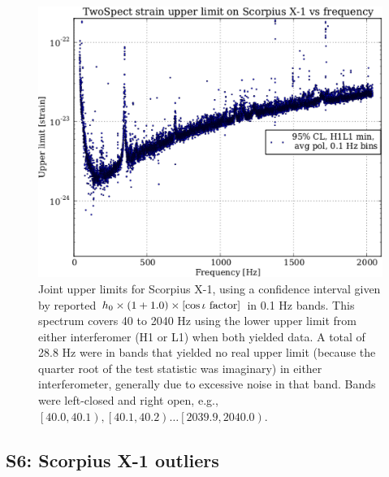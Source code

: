 \begin{figure}
\begin{center}
\includegraphics[width=0.8\paperwidth,height=0.4\paperheight]{plots/ScoX1ULs.eps}
\caption{
Joint upper limits for Scorpius X-1, using a confidence interval given by reported $h_0 \times \left( 1 + 1.0 \right) \times \left[\cos\iota \textup{ factor}\right]$ in 0.1 Hz bands. 
This spectrum covers 40 to 2040 Hz using the lower upper limit from either interferomer (H1 or L1) when both yielded data. 
A total of 28.8 Hz were in bands that yielded no real upper limit (because the quarter root of the test statistic was imaginary) in either interferometer, generally due to excessive noise in that band.
Bands were left-closed and right open, e.g., $\left[ 40.0,40.1\right), \left[ 40.1,40.2\right)\ldots \left[2039.9,2040.0\right)$.
}
\end{center}
\end{figure}

\subsection{S6: Scorpius X-1 outliers}

